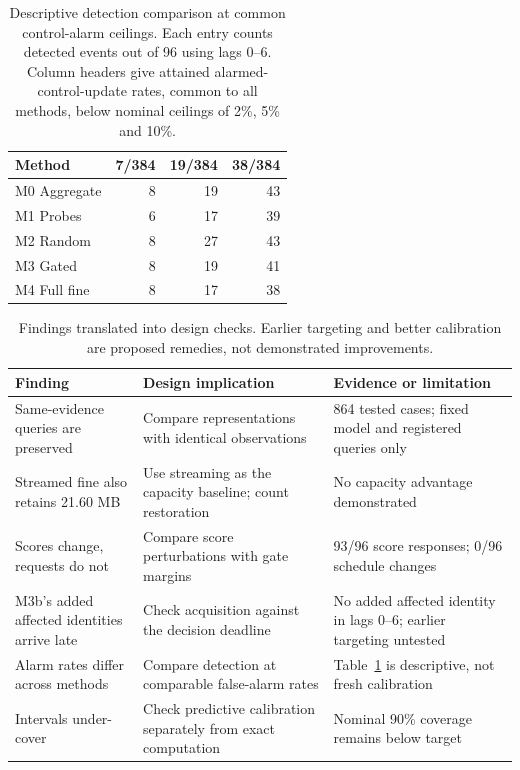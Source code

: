 \documentclass[conference]{IEEEtran}
\providecommand{\DIFaddend}{} %
\begin{document}
\DIFaddend \begin{table}[!htbp]
\color{blue}
\caption{Descriptive detection comparison at common control-alarm ceilings. Each entry counts detected events out of 96 using lags 0--6. Column headers give attained alarmed-control-update rates, common to all methods, below nominal ceilings of 2\%, 5\% and 10\%.}
\label{tab:alarm_rates}\centering
\begin{tabular}{lrrr}\toprule
Method & 7/384 & 19/384 & 38/384\\\midrule
M0 Aggregate & 8 & 19 & 43 \\
M1 Probes & 6 & 17 & 39 \\
M2 Random & 8 & 27 & 43 \\
M3 Gated & 8 & 19 & 41 \\
M4 Full fine & 8 & 17 & 38 \\
\bottomrule\end{tabular}

\end{table}
\begin{table}[!t]
\color{blue}
\caption{Findings translated into design checks. Earlier targeting and better calibration are proposed remedies, not demonstrated improvements.}
\label{tab:guidance}\centering
\begin{tabular}{p{}p{}p{}}
\toprule
Finding & Design implication & Evidence or limitation\\
\midrule
Same-evidence queries are preserved & Compare representations with identical observations & 864 tested cases; fixed model and registered queries only\\
Streamed fine also retains 21.60 MB & Use streaming as the capacity baseline; count restoration & No capacity advantage demonstrated\\
Scores change, requests do not & Compare score perturbations with gate margins & 93/96 score responses; 0/96 schedule changes\\
M3b's added affected identities arrive late & Check acquisition against the decision deadline & No added affected identity in lags 0--6; earlier targeting untested\\
Alarm rates differ across methods & Compare detection at comparable false-alarm rates & Table~\ref{tab:alarm_rates} is descriptive, not fresh calibration\\
Intervals under-cover & Check predictive calibration separately from exact computation & Nominal 90\% coverage remains below target\\
\bottomrule
\end{tabular}
\end{table}
\end{document}
